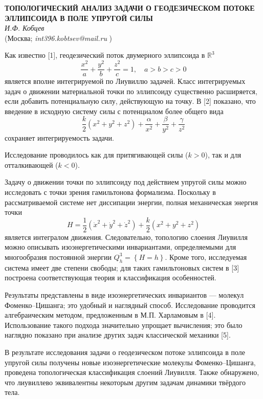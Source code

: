 \begin{center}{ \bf ТОПОЛОГИЧЕСКИЙ АНАЛИЗ ЗАДАЧИ О ГЕОДЕЗИЧЕСКОМ ПОТОКЕ ЭЛЛИПСОИДА В ПОЛЕ УПРУГОЙ СИЛЫ}\\
{\it И.Ф. Кобцев } \\
(Москва; {\it int396.kobtsev@mail.ru} )
\end{center}


Как известно [1], геодезический поток двумерного эллипсоида в $\mathbb{R}^3$
$$
\frac{x^2}{a}+\frac{y^2}{b}+\frac{z^2}{c}=1,\quad a>b>c>0
$$
является вполне интегрируемой по Лиувиллю задачей. Класс интегрируемых задач о движении материальной точки по эллипсоиду существенно расширяется, если добавить потенциальную силу, действующую на точку. В [2] показано, что введение в исходную систему силы с потенциалом более общего вида
$$
\frac{k}{2}\left( x^2+y^2+z^2\right)+\frac{\alpha}{x^2}+\frac{\beta}{y^2}+\frac{\gamma}{z^2}
$$
сохраняет интегрируемость задачи.

Исследование проводилось как для притягивающей силы ($k>0$), так и для отталкивающей ($k<0$).


Задачу о движении точки по эллипсоиду под действием упругой силы можно исследовать с точки зрения гамильтонова формализма. Поскольку в рассматриваемой системе нет диссипации энергии, полная механическая энергия точки
$$
H=\frac{1}{2}\left(\dot x^2+\dot y^2+\dot z^2\right)+\frac{k}{2}\left(x^2+y^2+z^2\right)
$$
является интегралом движения. Следовательно, топологию слоения Лиувилля можно описывать изоэнергетическими инвариантами, определяемыми для многообразия постоянной энергии $Q^3_h=\left\{H=h \right\}$. Кроме того, исследуемая система имеет две степени свободы; для таких гамильтоновых систем в [3] построена соответствующая теория и  классификация особенностей.


Результаты представлены в виде изоэнергетических инвариантов --- молекул Фоменко--Цишанга; это удобный и наглядный способ. Исследование проводится алгебраическим методом, предложенным в М.П. Харламовым в [4]. Использование такого подхода значительно упрощает вычисления; это было наглядно показано при анализе других задач классической механики [5].

В результате исследования задачи о геодезическом потоке эллипсоида в поле упругой силы получены новые изоэнергетические молекулы Фоменко--Цишанга, проведена топологическая классификация слоений Лиувилля. Также обнаружено, что лиувиллево эквивалентны некоторым другим задачам динамики твёрдого тела.


